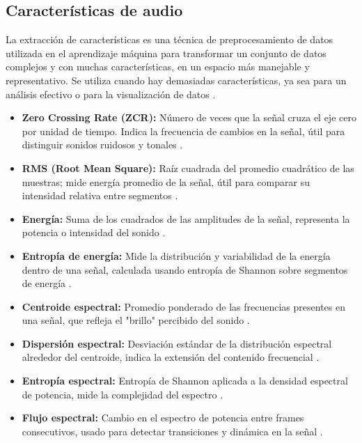 \subsection{Características de audio}
La extracción de características es una técnica de preprocesamiento de datos utilizada en el aprendizaje máquina para transformar un conjunto de datos complejos y con muchas características, en un espacio más manejable y representativo. Se utiliza cuando hay demasiadas características, ya sea para un análisis efectivo o para la visualización de datos \cite{richer_coelho_2013}.


\begin{itemize}
    \item \textbf{Zero Crossing Rate (ZCR):} Número de veces que la señal cruza el eje cero por unidad de tiempo. Indica la frecuencia de cambios en la señal, útil para distinguir sonidos ruidosos y tonales \cite{muller2015fundamentals}.

    \item \textbf{RMS (Root Mean Square):} Raíz cuadrada del promedio cuadrático de las muestras; mide energía promedio de la señal, útil para comparar su intensidad relativa entre segmentos \cite{sound_quality_heyboer2010}.

    \item \textbf{Energía:} Suma de los cuadrados de las amplitudes de la señal, representa la potencia o intensidad del sonido \cite{rabiner2010fundamentals}.

    \item \textbf{Entropía de energía:} Mide la distribución y variabilidad de la energía dentro de una señal, calculada usando entropía de Shannon sobre segmentos de energía \cite{li2017audio}.

    \item \textbf{Centroide espectral:} Promedio ponderado de las frecuencias presentes en una señal, que refleja el "brillo" percibido del sonido \cite{peeters2004musical}.

    \item \textbf{Dispersión espectral:} Desviación estándar de la distribución espectral alrededor del centroide, indica la extensión del contenido frecuencial \cite{peeters2004musical}.

    \item \textbf{Entropía espectral:} Entropía de Shannon aplicada a la densidad espectral de potencia, mide la complejidad del espectro \cite{jiang2011spectral}.

    \item \textbf{Flujo espectral:} Cambio en el espectro de potencia entre frames consecutivos, usado para detectar transiciones y dinámica en la señal \cite{foote1999automatic}.


\end{itemize}
